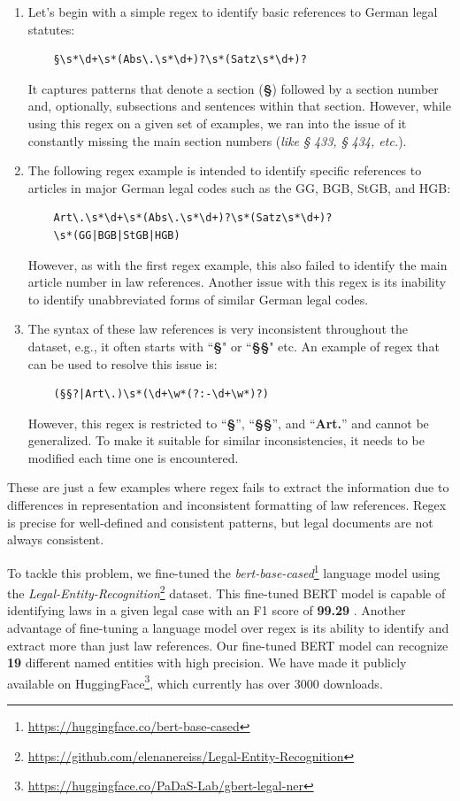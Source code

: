 \documentclass{IOS-Book-Article}
\begin{document}
\begin{mdframed}
\begin{enumerate}
\item Let's begin with a simple regex to identify basic references to German legal statutes:
\begin{verbatim}
    §\s*\d+\s*(Abs\.\s*\d+)?\s*(Satz\s*\d+)?
\end{verbatim}
It captures patterns that denote a section (\textbf{§}) followed by a section number and, optionally, subsections and sentences within that section. However, while using this regex on a given set of examples, we ran into the issue of it constantly missing the main section numbers (\textit{like § 433, § 434, etc.}).\\

\item The following regex example is intended to identify specific references to articles in major German legal codes such as the GG, BGB, StGB, and HGB:
\begin{verbatim}
    Art\.\s*\d+\s*(Abs\.\s*\d+)?\s*(Satz\s*\d+)?
    \s*(GG|BGB|StGB|HGB)
\end{verbatim}
However, as with the first regex example, this also failed to identify the main article number in law references. Another issue with this regex is its inability to identify unabbreviated forms of similar German legal codes.\\

\item The syntax of these law references is very inconsistent throughout the dataset, e.g., it often starts with ``\textbf{§}" or ``\textbf{§§}" etc. \cite{r11} An example of regex that can be used to resolve this issue is:
\begin{verbatim}
    (§§?|Art\.)\s*(\d+\w*(?:-\d+\w*)?)
\end{verbatim}
However, this regex is restricted to “\textbf{§}”, “\textbf{§§}”, and “\textbf{Art.}” and cannot be generalized. To make it suitable for similar inconsistencies, it needs to be modified each time one is encountered.
\end{enumerate}
\end{mdframed}

These are just a few examples where regex fails to extract the information due to differences in representation and inconsistent formatting of law references. Regex is precise for well-defined and consistent patterns, but legal documents are not always consistent.

To tackle this problem, we fine-tuned the \textit{bert-base-cased}\footnote{\url{https://huggingface.co/bert-base-cased}} language model using the \textit{Legal-Entity-Recognition}\footnote{\url{https://github.com/elenanereiss/Legal-Entity-Recognition}} dataset. This fine-tuned BERT model is capable of identifying laws in a given legal case with an F1 score of \textbf{99.29} \cite{r12}. Another advantage of fine-tuning a language model over regex is its ability to identify and extract more than just law references. Our fine-tuned BERT model can recognize \textbf{19} different named entities with high precision. We have made it publicly available on HuggingFace\footnote{\url{https://huggingface.co/PaDaS-Lab/gbert-legal-ner}}, which currently has over 3000 downloads.
\end{document}
